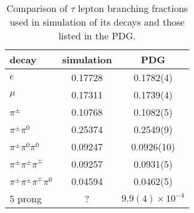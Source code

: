 \begin{table}[ht]
    \centering
    \setlength{\tabcolsep}{2em}
    \renewcommand{\arraystretch}{1.5}
    \begin{tabular}{l|cc}
        decay                                & simulation & PDG       \\
        \hline
        $e$                                  & 0.17728    & 0.1782(4) \\
        $\mu$                                & 0.17311    & 0.1739(4) \\
        $\pi^{\pm}$                          & 0.10768    & 0.1082(5) \\
        $\pi^{\pm}\pi^{0}$                   & 0.25374    & 0.2549(9) \\
        $\pi^{\pm}\pi^{0}\pi^{0}$            & 0.09247    & 0.0926(10) \\
        $\pi^{\pm}\pi^{\pm}\pi^{\mp}$        & 0.09257    & 0.0931(5) \\
        $\pi^{\pm}\pi^{\pm}\pi^{\mp}\pi^{0}$ & 0.04594    & 0.0462(5) \\
        5 prong                              & ?          & $9.9(4)\times 10^{-4}$ \\
    \end{tabular}
    \caption{Comparison of $\tau$ lepton branching fractions used in simulation of its decays and those listed in the PDG.} 
    \label{tab:dat:tauDecayBr}
\end{table}